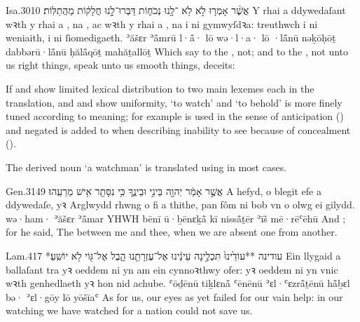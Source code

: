 \begin{example}{Isa.}{30}{10}{}{}
	\quoling
	{אֲשֶׁ֨ר אָמְר֤וּ  לֹ֣א   לֹ֥א ־לָ֖נוּ נְכֹח֑וֹת דַּבְּרוּ־לָ֣נוּ חֲלָק֔וֹת  מַהֲתַלּֽוֹת׃}
	{Y rhai a ddywedaſant wꝛth y rhai a , na , ac wꝛth y rhai a , na  i ni gymwyſdꝛa: treuthwch i ni weniaith,  i ni ſiomedigaeth.}
	{ʾăšɛr ʾå̄mrū l·å̄· lō  wə·l·a· lō ·lå̄nū nəḵōḥōṯ dabbərū·lå̄nū ḥălå̄qōṯ  mahăṯallōṯ}
	{Which say to the ,  not; and to the ,  not unto us right things, speak unto us smooth things,  deceits:}
\end{example}




\begin{paper}
	{\click} If  and  show limited lexical distribution to two main lexemes each in the translation, and  and  show uniformity,  ‘to watch’ and  ‘to behold’ is more finely tuned according to meaning; for example  is used in the sense of anticipation () and negated  is added to  when describing inability to see because of concealment ().

	The derived noun  ‘a watchman’ is translated using  in most cases.
\end{paper}

\begin{example}{Gen.}{31}{49}{}{}
	\quoling
	{ אֲשֶׁ֣ר אָמַ֔ר  יְהוָ֖ה בֵּינִ֣י וּבֵינֶ֑ךָ כִּ֥י נִסָּתֵ֖ר אִ֥ישׁ מֵרֵעֵֽהוּ׃}
	{A  hefyd, o blegit efe a ddywedaſe,  yꝛ Arglwydd rhwng o fi a thithe, pan fôm ni bob vn o olwg ei gilydd.}
	{wə·ham· ʾăšɛr ʾå̄mar  YHWH bēnī ū·ḇēnɛḵå̄ kī nisså̄ṯēr ʾīš mē·rēʿēhū}
	{And ; for he said, The {\LORD}  between me and thee, when we are absent one from another.}
\end{example}

\begin{example}{Lam.}{4}{17}{}{}
	\quoling
	{*עודינה **עוֹדֵ֙ינוּ֙ תִּכְלֶ֣ינָה עֵינֵ֔ינוּ אֶל־עֶזְרָתֵ֖נוּ הָ֑בֶל   אֶל־גּ֖וֹי לֹ֥א יוֹשִֽׁעַ׃}
	{Ein llygaid a ballaſant tra yꝛ oeddem ni yn  am ein cynnoꝛthwy ofer:  yꝛ oeddem ni yn vnic wꝛth genhedlaeth yꝛ hon nid achube.}
	{ʿōḏēnū tiḵlɛnå̄ ʿēnēnū ʾɛl·ʿɛzrå̄ṯēnū hå̄ḇɛl bə·  ʾɛl·gōy lō yōšīaʿ}
	{As for us, our eyes as yet failed for our vain help: in our watching we have watched for a nation  could not save us.}
\end{example}

